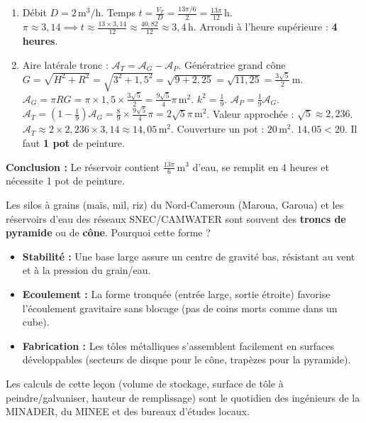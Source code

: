 \documentclass[11pt]{article}
\begin{document}
\begin{exoresolu}
\begin{enumerate}
        \item Débit $D = 2\,\text{m}^3/\text{h}$. Temps $t = \frac{V_T}{D} = \frac{13\pi/6}{2} = \frac{13\pi}{12}\,\text{h}$.
            $\pi \approx 3,14 \implies t \approx \frac{13 \times 3,14}{12} \approx \frac{40,82}{12} \approx 3,4\,\text{h}$.
            Arrondi à l'heure supérieure : \textbf{4 heures}.
        \item Aire latérale tronc : $\mathcal{A}_T = \mathcal{A}_G - \mathcal{A}_P$.
            Génératrice grand cône $G = \sqrt{H^2 + R^2} = \sqrt{3^2 + 1,5^2} = \sqrt{9 + 2,25} = \sqrt{11,25} = \frac{3\sqrt{5}}{2}\,\text{m}$.
            $\mathcal{A}_G = \pi R G = \pi \times 1,5 \times \frac{3\sqrt{5}}{2} = \frac{9\sqrt{5}}{4}\pi\,\text{m}^2$.
            $k^2 = \frac{1}{9}$. $\mathcal{A}_P = \frac{1}{9}\mathcal{A}_G$.
            $\mathcal{A}_T = (1 - \frac{1}{9})\mathcal{A}_G = \frac{8}{9} \times \frac{9\sqrt{5}}{4}\pi = 2\sqrt{5}\pi\,\text{m}^2$.
            Valeur approchée : $\sqrt{5} \approx 2,236$. $\mathcal{A}_T \approx 2 \times 2,236 \times 3,14 \approx 14,05\,\text{m}^2$.
            Couverture un pot : $20\,\text{m}^2$. $14,05 < 20$.
            Il faut \textbf{1 pot} de peinture.
    \end{enumerate}
    \textbf{Conclusion :} Le réservoir contient $\frac{13\pi}{6}\,\text{m}^3$ d'eau, se remplit en 4 heures et nécessite 1 pot de peinture.
\end{exoresolu}

\begin{savaistu}
    Les silos à grains (maïs, mil, riz) du Nord-Cameroun (Maroua, Garoua) et les réservoirs d'eau des réseaux SNEC/CAMWATER sont souvent des \textbf{troncs de pyramide} ou de \textbf{cône}. Pourquoi cette forme ?
    \begin{itemize}
        \item \textbf{Stabilité :} Une base large assure un centre de gravité bas, résistant au vent et à la pression du grain/eau.
        \item \textbf{Ecoulement :} La forme tronquée (entrée large, sortie étroite) favorise l'écoulement gravitaire sans blocage (pas de coins morts comme dans un cube).
        \item \textbf{Fabrication :} Les tôles métalliques s'assemblent facilement en surfaces développables (secteurs de disque pour le cône, trapèzes pour la pyramide).
    \end{itemize}
    Les calculs de cette leçon (volume de stockage, surface de tôle à peindre/galvaniser, hauteur de remplissage) sont le quotidien des ingénieurs de la MINADER, du MINEE et des bureaux d'études locaux.
\end{savaistu}
\end{document}
